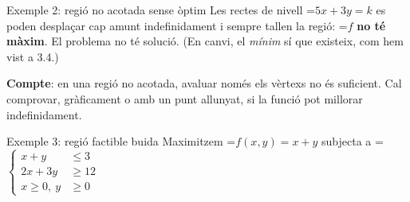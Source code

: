 \documentclass[11pt,a4paper]{article}
\newcommand{\fmm}[1]{\setbox0=\hbox{$#1$}\ifdim\wd0>\linewidth\fmdisp{#1}\else\mbox{\box0}\fi}
\newcommand{\fmdisp}[1]{\[\setbox2=\hbox{$\displaystyle #1$}\ifdim\wd2>\linewidth\resizebox{\linewidth}{!}{\box2}\else\box2\fi\]}
\newcommand{\fmuline}[1]{\textbf{\color{fmaccent}#1}}
\begin{document}
\begin{fmex}{Exemple 2: regió no acotada sense òptim}
Les rectes de nivell \fmm{5x+3y=k} es poden desplaçar cap amunt indefinidament i sempre tallen la regió: \fmm{f} \textbf{no té màxim}. El problema no té solució. (En canvi, el \emph{mínim} sí que existeix, com hem vist a 3.4.)

\begin{fmnote}\fmuline{Compte}: en una regió no acotada, avaluar només els vèrtexs no és suficient. Cal comprovar, gràficament o amb un punt allunyat, si la funció pot millorar indefinidament.\end{fmnote}
\end{fmex}

\begin{fmex}{Exemple 3: regió factible buida}
Maximitzem \fmm{f(x,y)=x+y} subjecta a \fmm{\left\{\begin{aligned}x+y&\leq3\\ 2x+3y&\geq12\\ x\geq0,\ y&\geq0\end{aligned}\right.}


\end{fmex}
\end{document}
